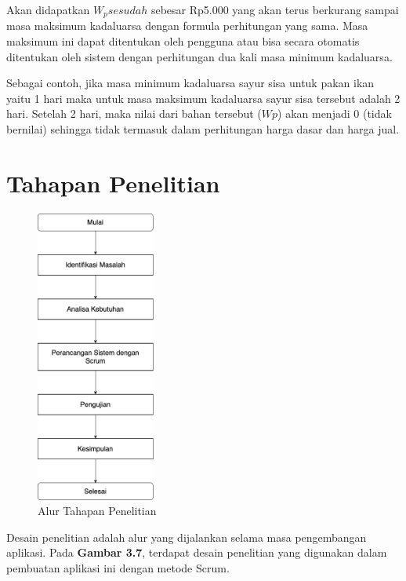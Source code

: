Akan didapatkan $W_psesudah$ sebesar Rp5.000 yang akan terus berkurang sampai masa maksimum kadaluarsa dengan formula perhitungan yang sama. Masa maksimum ini dapat ditentukan oleh pengguna atau bisa secara otomatis ditentukan oleh sistem dengan perhitungan dua kali masa minimum kadaluarsa.

Sebagai contoh, jika masa minimum kadaluarsa sayur sisa untuk pakan ikan yaitu 1 hari maka untuk masa maksimum kadaluarsa sayur sisa tersebut adalah 2 hari. Setelah 2 hari, maka nilai dari bahan tersebut ($Wp$) akan menjadi 0 (tidak bernilai) sehingga tidak termasuk dalam perhitungan harga dasar dan harga jual.

\section{Tahapan Penelitian}

\begin{figure}[H]
	\centering
	\includegraphics[width=0.35\textwidth]{gambar/tahapan_penelitian.png}
	\caption{Alur Tahapan Penelitian}
\end{figure}

Desain penelitian adalah alur yang dijalankan selama masa pengembangan aplikasi. Pada \textbf{Gambar 3.7}, terdapat desain penelitian yang digunakan dalam pembuatan aplikasi ini dengan metode Scrum.


